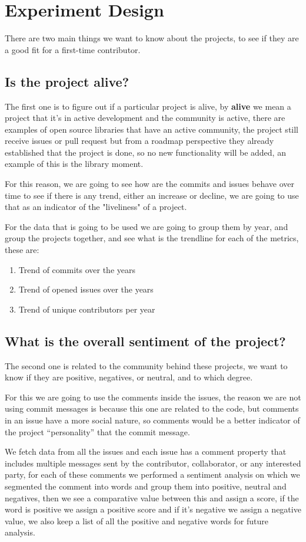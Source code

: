 \section{Experiment Design}
There are two main things we want to know about the projects, to see if they are a good fit for a first-time contributor.

\subsection{Is the project alive?}
The first one is to figure out if a particular project is alive, by \textbf{alive} we mean a project that it's in active development and the community is active, there are examples of open source libraries that have an active community, the project still receive issues or pull request but from a roadmap perspective they already established that the project is done, so no new functionality will be added, an example of this is the library moment\cite{moment}.

For this reason, we are going to see how are the commits and issues behave over time to see if there is any trend, either an increase or decline, we are going to use that as an indicator of the "liveliness" of a project.

For the data that is going to be used we are going to group them by year, and group the projects together, and see what is the trendline for each of the metrics, these are:
\begin{enumerate}
    \fontsize{10pt}{10pt}
    \selectfont
    \item Trend of commits over the years
    \item Trend of opened issues over the years
    \item Trend of unique contributors per year
\end{enumerate}

\subsection{What is the overall sentiment of the project?}
The second one is related to the community behind these projects, we want to know if they are positive, negatives, or neutral, and to which degree.

For this we are going to use the comments inside the issues, the reason we are not using commit messages is because this one are related to the code, but comments in an issue have a more social nature, so comments would be a better indicator of the project “personality” that the commit message.

We fetch data from all the issues and each issue has a comment property that includes multiple messages sent by the contributor, collaborator, or any interested party, for each of these comments we performed a sentiment analysis on which we segmented the comment into words and group them into positive, neutral and negatives, then we see a comparative value between this and assign a score, if the word is positive we assign a positive score and if it’s negative we assign a negative value, we also keep a list of all the positive and negative words for future analysis.